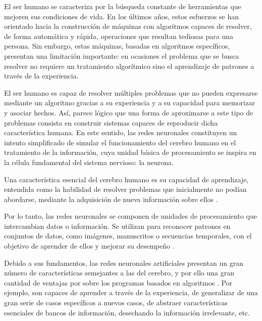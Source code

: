 El ser humano se caracteriza por la búsqueda constante de herramientas que mejoren sus condiciones de vida. En los últimos años, estos esfuerzos se han orientado hacia la construcción de máquinas con algoritmos capaces de resolver, de forma automática y rápida, operaciones que resultan tediosas para una persona. Sin embargo, estas máquinas, basadas en algoritmos específicos, presentan una limitación importante: en ocasiones el problema que se busca resolver no requiere un tratamiento algorítmico sino el aprendizaje de patrones a través de la experiencia. 

El ser humano es capaz de resolver múltiples problemas que no pueden expresarse mediante un algoritmo gracias a su experiencia y a su capacidad para memorizar y asociar hechos. Así, parece lógico que una forma de aproximarse a este tipo de problemas consista en construir sistemas capaces de reproducir dicha característica humana. En este sentido, las redes neuronales constituyen un intento simplificado de simular el funcionamiento del cerebro humano en el tratamiento de la información, cuya unidad básica de procesamiento se inspira en la célula fundamental del sistema nervioso: la neurona.

Una característica esencial del cerebro humano es su capacidad de aprendizaje, entendida como la habilidad de resolver problemas que inicialmente no podían abordarse, mediante la adquisición de nueva información sobre ellos \citep{matich2001redes, salas2004redes, tablada2009redes, izaurieta2000redes}.

Por lo tanto, las redes neuronales se componen de unidades de procesamiento que intercambian datos o información. Se utilizan para reconocer patrones en conjuntos de datos, como imágenes, manuscritos o secuencias temporales, con el objetivo de aprender de ellos y mejorar su desempeño \citep{matich2001redes}.

Debido a sus fundamentos, las redes neuronales artificiales presentan un gran número de características semejantes a las del cerebro, y por ello una gran cantidad de ventajas por sobre los programas basados en algoritmos \cite{McCullochPitts1943}. Por ejemplo, son capaces de aprender a través de la experiencia, de generalizar de una gran serie de casos específicos a nuevos casos, de abstraer características esenciales de bancos de información, desechando la información irrelevante, etc. 

